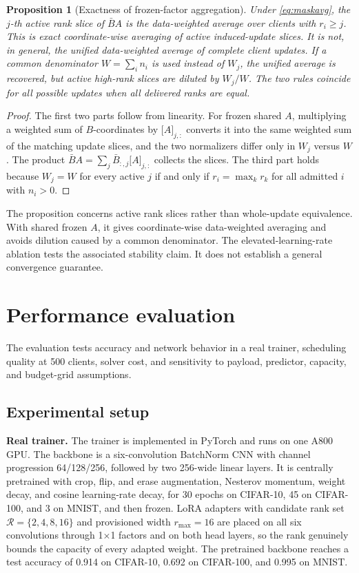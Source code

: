 \documentclass[preprint,12pt]{elsarticle}
\newtheorem{proposition}{Proposition}
\begin{document}
\begin{proposition}[Exactness of frozen-factor aggregation]
\label{prop:agg}
Under \eqref{eq:maskavg}, the $j$-th active rank slice of $\bar BA$ is the data-weighted average over clients with $r_i\ge j$. This is exact coordinate-wise averaging of active induced-update slices. It is not, in general, the unified data-weighted average of complete client updates. If a common denominator $W=\sum_i n_i$ is used instead of $W_j$, the unified average is recovered, but active high-rank slices are diluted by $W_j/W$. The two rules coincide for all possible updates when all delivered ranks are equal.
\end{proposition}
\begin{proof}
The first two parts follow from linearity. For frozen shared $A$, multiplying a weighted sum of $B$-coordinates by $\big[A\big]_{j,:}$ converts it into the same weighted sum of the matching update slices, and the two normalizers differ only in $W_j$ versus $W$. The product $\bar BA=\sum_j\bar B_{:,j}\big[A\big]_{j,:}$ collects the slices. The third part holds because $W_j=W$ for every active $j$ if and only if $r_i=\max_k r_k$ for all admitted $i$ with $n_i>0$.
\end{proof}

The proposition concerns active rank slices rather than whole-update equivalence. With shared frozen $A$, it gives coordinate-wise data-weighted averaging and avoids dilution caused by a common denominator. The elevated-learning-rate ablation tests the associated stability claim. It does not establish a general convergence guarantee.

\section{Performance evaluation}
\label{sec:eval}

The evaluation tests accuracy and network behavior in a real trainer, scheduling quality at 500 clients, solver cost, and sensitivity to payload, predictor, capacity, and budget-grid assumptions.

\subsection{Experimental setup}
\textbf{Real trainer.} The trainer is implemented in PyTorch and runs on one A800 GPU. The backbone is a six-convolution BatchNorm CNN with channel progression 64/128/256, followed by two 256-wide linear layers. It is centrally pretrained with crop, flip, and erase augmentation, Nesterov momentum, weight decay, and cosine learning-rate decay, for 30 epochs on CIFAR-10, 45 on CIFAR-100, and 3 on MNIST, and then frozen. LoRA adapters with candidate rank set $\mathcal R=\{2,4,8,16\}$ and provisioned width $r_{\max}=16$ are placed on all six convolutions through 1$\times$1 factors and on both head layers, so the rank genuinely bounds the capacity of every adapted weight. The pretrained backbone reaches a test accuracy of 0.914 on CIFAR-10, 0.692 on CIFAR-100, and 0.995 on MNIST.
\end{document}
